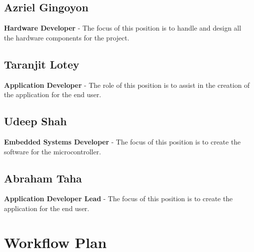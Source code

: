 \documentclass[12pt, titlepage]{article}
\begin{document}
\subsection*{Azriel Gingoyon}
\textbf{Hardware Developer} - The focus of this position is to handle and design all the hardware components for the project.

\subsection*{Taranjit Lotey}
\textbf{Application Developer} - The role of this position is to assist in the creation of the application for the end user.
                                
\subsection*{Udeep Shah}
\textbf{Embedded Systems Developer} - The focus of this position is to create the software for the microcontroller.

\subsection*{Abraham Taha}
\textbf{Application Developer Lead} - The focus of this position is to create the application for the end user.


\section{Workflow Plan}
\end{document}
